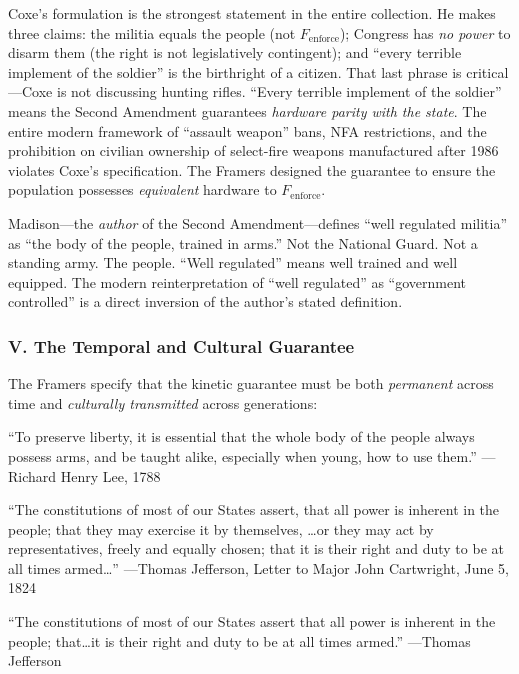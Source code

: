 \documentclass[12pt,openany]{book}
\begin{document}
Coxe's formulation is the strongest statement in the entire collection. He makes three claims: the militia equals the people (not $F_{\text{enforce}}$); Congress has \textit{no power} to disarm them (the right is not legislatively contingent); and ``every terrible implement of the soldier'' is the birthright of a citizen. That last phrase is critical---Coxe is not discussing hunting rifles. ``Every terrible implement of the soldier'' means the Second Amendment guarantees \textit{hardware parity with the state}. The entire modern framework of ``assault weapon'' bans, NFA restrictions, and the prohibition on civilian ownership of select-fire weapons manufactured after 1986 violates Coxe's specification. The Framers designed the guarantee to ensure the population possesses \textit{equivalent} hardware to $F_{\text{enforce}}$.

Madison---the \textit{author} of the Second Amendment---defines ``well regulated militia'' as ``the body of the people, trained in arms.'' Not the National Guard. Not a standing army. The people. ``Well regulated'' means well trained and well equipped. The modern reinterpretation of ``well regulated'' as ``government controlled'' is a direct inversion of the author's stated definition.

\subsubsection*{V. The Temporal and Cultural Guarantee}

The Framers specify that the kinetic guarantee must be both \textit{permanent} across time and \textit{culturally transmitted} across generations:

\begin{historicalsource}
``To preserve liberty, it is essential that the whole body of the people always possess arms, and be taught alike, especially when young, how to use them.'' \hfill ---Richard Henry Lee, 1788

\medskip
``The constitutions of most of our States assert, that all power is inherent in the people; that they may exercise it by themselves, \ldots or they may act by representatives, freely and equally chosen; that it is their right and duty to be at all times armed\ldots'' \hfill ---Thomas Jefferson, Letter to Major John Cartwright, June 5, 1824

\medskip
``The constitutions of most of our States assert that all power is inherent in the people; that\ldots it is their right and duty to be at all times armed.'' \hfill ---Thomas Jefferson
\end{historicalsource}
\end{document}
